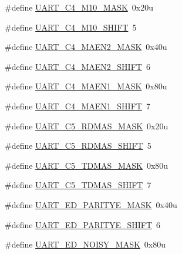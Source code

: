 \begin{DoxyCompactItemize}
\item 
\#define \hyperlink{group___u_a_r_t___register___masks_ga9e9d5093d6aec7bd4c3f418ee54f8801}{U\+A\+R\+T\+\_\+\+C4\+\_\+\+M10\+\_\+\+M\+A\+SK}~0x20u
\item 
\#define \hyperlink{group___u_a_r_t___register___masks_gafd4cf70aa0988a96e3744eae7a0f036d}{U\+A\+R\+T\+\_\+\+C4\+\_\+\+M10\+\_\+\+S\+H\+I\+FT}~5
\item 
\#define \hyperlink{group___u_a_r_t___register___masks_gac1c8fa0730a887b5d4d43f426b27c955}{U\+A\+R\+T\+\_\+\+C4\+\_\+\+M\+A\+E\+N2\+\_\+\+M\+A\+SK}~0x40u
\item 
\#define \hyperlink{group___u_a_r_t___register___masks_ga5ec71022d0264fefd4c63118d90adbb2}{U\+A\+R\+T\+\_\+\+C4\+\_\+\+M\+A\+E\+N2\+\_\+\+S\+H\+I\+FT}~6
\item 
\#define \hyperlink{group___u_a_r_t___register___masks_gaa345d5da303c56b2881394dc0e003337}{U\+A\+R\+T\+\_\+\+C4\+\_\+\+M\+A\+E\+N1\+\_\+\+M\+A\+SK}~0x80u
\item 
\#define \hyperlink{group___u_a_r_t___register___masks_ga28655a6deae1adc48798c91db8ce24e1}{U\+A\+R\+T\+\_\+\+C4\+\_\+\+M\+A\+E\+N1\+\_\+\+S\+H\+I\+FT}~7
\item 
\#define \hyperlink{group___u_a_r_t___register___masks_gaef3503f3521ec37397d2d19e7da7bd58}{U\+A\+R\+T\+\_\+\+C5\+\_\+\+R\+D\+M\+A\+S\+\_\+\+M\+A\+SK}~0x20u
\item 
\#define \hyperlink{group___u_a_r_t___register___masks_gab95d268a11167ac6ab4cf41332bf5aa6}{U\+A\+R\+T\+\_\+\+C5\+\_\+\+R\+D\+M\+A\+S\+\_\+\+S\+H\+I\+FT}~5
\item 
\#define \hyperlink{group___u_a_r_t___register___masks_ga593bf2d9f1d2a222d8cbde7b88aba833}{U\+A\+R\+T\+\_\+\+C5\+\_\+\+T\+D\+M\+A\+S\+\_\+\+M\+A\+SK}~0x80u
\item 
\#define \hyperlink{group___u_a_r_t___register___masks_gadf4f03768249772994b3082c369698e7}{U\+A\+R\+T\+\_\+\+C5\+\_\+\+T\+D\+M\+A\+S\+\_\+\+S\+H\+I\+FT}~7
\item 
\#define \hyperlink{group___u_a_r_t___register___masks_gad2d9046649263c73bfa0e64091c82d45}{U\+A\+R\+T\+\_\+\+E\+D\+\_\+\+P\+A\+R\+I\+T\+Y\+E\+\_\+\+M\+A\+SK}~0x40u
\item 
\#define \hyperlink{group___u_a_r_t___register___masks_gaed5785f9e519dfa7936d82f4fedb8a83}{U\+A\+R\+T\+\_\+\+E\+D\+\_\+\+P\+A\+R\+I\+T\+Y\+E\+\_\+\+S\+H\+I\+FT}~6
\item 
\#define \hyperlink{group___u_a_r_t___register___masks_gab5ab58923c23cde1672fc9ae19053696}{U\+A\+R\+T\+\_\+\+E\+D\+\_\+\+N\+O\+I\+S\+Y\+\_\+\+M\+A\+SK}~0x80u

\end{DoxyCompactItemize}
